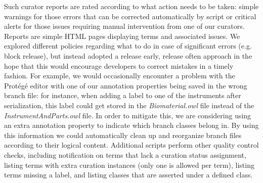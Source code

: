 \documentclass{elsart}       %
\begin{document}


Such curator reports are rated according to what action needs to be taken: simple warnings for those errors that can be corrected automatically by script or critical alerts for those issues requiring manual intervention from one of our curators. Reports are simple HTML pages displaying terms and associated issues.
We explored different policies regarding what to do in case of significant errors (e.g. block release), but instead adopted a release early, release often approach in the hope that this would encourage developers to correct mistakes in a timely fashion.
For example, we would occasionally encounter a problem with the Prot\'eg\'e\cite{protege} editor with one of our annotation properties being saved in the wrong branch file: for instance, when adding a label to one of the instruments after serialization, this label could get stored in the \emph{Biomaterial.owl} file instead of the \emph{InstrumentAndParts.owl} file. 
In order to mitigate this, we are considering using an extra annotation property to indicate which branch classes belong in.
By using this information we could automatically clean up and reorganize branch files according to their logical content.
Additional scripts perform other quality control checks, including notification on terms that lack a curation status assignment, listing terms with extra curation instances (only one is allowed per term), listing terms missing a label, and listing classes that are asserted under a defined class.

\end{document}

